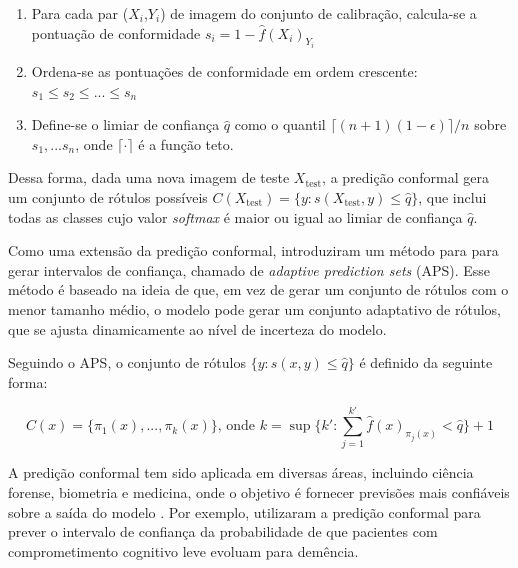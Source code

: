 \begin{enumerate}
    \item Para cada par ($X_i$,$Y_i$) de imagem do conjunto de calibração, calcula-se a pontuação de conformidade $s_i = 1 - \hat{f}(X_i)_{Y_i}$
    \item Ordena-se as pontuações de conformidade em ordem crescente: $s_1 \leq s_2 \leq ... \leq s_n$
    \item Define-se o limiar de confiança $\hat{q}$ como o quantil ${\lceil (n+1)(1-\epsilon) \rceil}/n$ sobre $s_1, ... s_n$, onde $\lceil \cdot \rceil$ é a função teto.
\end{enumerate}

Dessa forma, dada uma nova imagem de teste $X_{\text{test}}$, a predição conformal gera um conjunto de rótulos possíveis $C(X_{\text{test}}) = \lbrace y:s(X_{\text{test}},y) \leq \hat{q} \rbrace$, que inclui todas as classes cujo valor \textit{softmax} é maior ou igual ao limiar de confiança $\hat{q}$.

Como uma extensão da predição conformal, \cite{angelopoulos2021gentle} introduziram um método para para gerar intervalos de confiança, chamado de \textit{adaptive prediction sets} (APS). Esse método é baseado na ideia de que, em vez de gerar um conjunto de rótulos com o menor tamanho médio, o modelo pode gerar um conjunto adaptativo de rótulos, que se ajusta dinamicamente ao nível de incerteza do modelo.

Seguindo o APS, o conjunto de rótulos $\lbrace y: s(x,y) \leq \hat{q} \rbrace$ é definido da seguinte forma:

\begin{equation}
    C(x) = \lbrace \pi_1(x), ..., \pi_k(x) \rbrace \text{, onde } k = \sup \Bigg\lbrace k' : \sum_{j=1}^{k'} \hat{f}(x)_{\pi_j(x)} < \hat{q} \Bigg\rbrace + 1
\end{equation}

A predição conformal tem sido aplicada em diversas áreas, incluindo ciência forense, biometria e medicina, onde o objetivo é fornecer previsões mais confiáveis sobre a saída do modelo \citep{Fontana2023}. Por exemplo, \cite{Pereira2020} utilizaram a predição conformal para prever o intervalo de confiança da probabilidade de que pacientes com comprometimento cognitivo leve evoluam para demência.